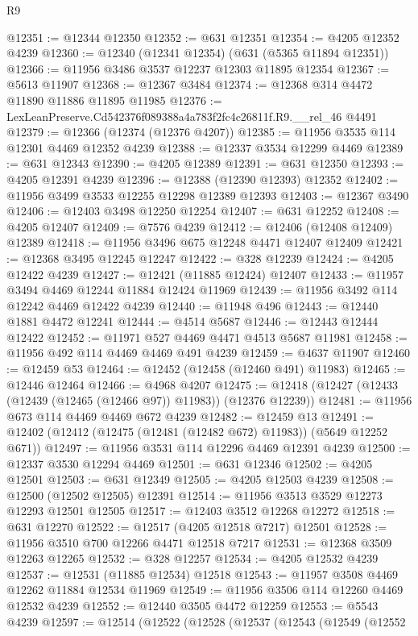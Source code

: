 \begin{lexlean}{R9}
\begin{coremodule}
@12351 := @12344 @12350
@12352 := @631 @12351
@12354 := @4205 @12352 @4239
@12360 := @12340 (@12341 @12354) (@631 (@5365 @11894 @12351))
@12366 := @11956 @3486 @3537 @12237 @12303 @11895 @12354
@12367 := @5613 @11907
@12368 := @12367 @3484
@12374 := @12368 @314 @4472 @11890 @11886 @11895 @11985
@12376 := LexLeanPreserve.Cd542376f089388a4a783f2fc4c26811f.R9.__rel_46 @4491
@12379 := @12366 (@12374 (@12376 @4207))
@12385 := @11956 @3535 @114 @12301 @4469 @12352 @4239
@12388 := @12337 @3534 @12299 @4469
@12389 := @631 @12343
@12390 := @4205 @12389
@12391 := @631 @12350
@12393 := @4205 @12391 @4239
@12396 := @12388 (@12390 @12393) @12352
@12402 := @11956 @3499 @3533 @12255 @12298 @12389 @12393
@12403 := @12367 @3490
@12406 := @12403 @3498 @12250 @12254
@12407 := @631 @12252
@12408 := @4205 @12407
@12409 := @7576 @4239
@12412 := @12406 (@12408 @12409) @12389
@12418 := @11956 @3496 @675 @12248 @4471 @12407 @12409
@12421 := @12368 @3495 @12245 @12247
@12422 := @328 @12239
@12424 := @4205 @12422 @4239
@12427 := @12421 (@11885 @12424) @12407
@12433 := @11957 @3494 @4469 @12244 @11884 @12424 @11969
@12439 := @11956 @3492 @114 @12242 @4469 @12422 @4239
@12440 := @11948 @496
@12443 := @12440 @1881 @4472 @12241
@12444 := @4514 @5687
@12446 := @12443 @12444 @12422
@12452 := @11971 @527 @4469 @4471 @4513 @5687 @11981
@12458 := @11956 @492 @114 @4469 @4469 @491 @4239
@12459 := @4637 @11907
@12460 := @12459 @53
@12464 := @12452 (@12458 (@12460 @491) @11983)
@12465 := @12446 @12464
@12466 := @4968 @4207
@12475 := @12418 (@12427 (@12433 (@12439 (@12465 (@12466 @97)) @11983)) (@12376 @12239))
@12481 := @11956 @673 @114 @4469 @4469 @672 @4239
@12482 := @12459 @13
@12491 := @12402 (@12412 (@12475 (@12481 (@12482 @672) @11983)) (@5649 @12252 @671))
@12497 := @11956 @3531 @114 @12296 @4469 @12391 @4239
@12500 := @12337 @3530 @12294 @4469
@12501 := @631 @12346
@12502 := @4205 @12501
@12503 := @631 @12349
@12505 := @4205 @12503 @4239
@12508 := @12500 (@12502 @12505) @12391
@12514 := @11956 @3513 @3529 @12273 @12293 @12501 @12505
@12517 := @12403 @3512 @12268 @12272
@12518 := @631 @12270
@12522 := @12517 (@4205 @12518 @7217) @12501
@12528 := @11956 @3510 @700 @12266 @4471 @12518 @7217
@12531 := @12368 @3509 @12263 @12265
@12532 := @328 @12257
@12534 := @4205 @12532 @4239
@12537 := @12531 (@11885 @12534) @12518
@12543 := @11957 @3508 @4469 @12262 @11884 @12534 @11969
@12549 := @11956 @3506 @114 @12260 @4469 @12532 @4239
@12552 := @12440 @3505 @4472 @12259
@12553 := @5543 @4239
@12597 := @12514
    (@12522
      (@12528
        (@12537
          (@12543
            (@12549
              (@12552

\end{coremodule}
\end{lexlean}
